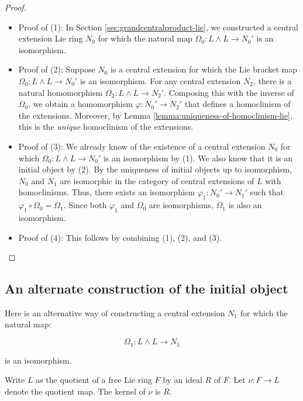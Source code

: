 \begin{proof}
  \begin{itemize}
  \item Proof of (1): In Section \ref{sec:grandcentralproduct-lie}, we
    constructed a central extension Lie ring $N_0$ for which the natural
    map $\Omega_0: L \wedge L \to N_0'$ is an isomorphism.

  \item Proof of (2): Suppose $N_0$ is a central extension for which
    the Lie bracket map $\Omega_0:L \wedge L \to N_0'$ is an
    isomorphism. For any central extension $N_2$, there is a natural
    homomorphism $\Omega_2: L \wedge L \to N_2'$. Composing this with
    the inverse of $\Omega_0$, we obtain a homomorphism
    $\varphi:N_0' \to N_2'$ that defines a homoclinism of the
    extensions. Moreover, by Lemma
    \ref{lemma:uniqueness-of-homoclinism-lie}, this is the {\em unique}
    homoclinism of the extensions.

  \item Proof of (3): We already know of the existence of a central
    extension $N_0$ for which $\Omega_0:L \wedge L \to N_0'$ is
    an isomorphism by (1). We also know that it is an initial object
    by (2). By the uniqueness of initial objects up to isomorphism,
    $N_0$ and $N_1$ are isomorphic in the category of central
    extensions of $L$ with homoclinisms. Thus, there exists an
    isomorphism $\varphi_1:N_0' \to N_1'$ such that $\varphi_1 \circ
    \Omega_0 = \Omega_1$. Since both $\varphi_1$ and $\Omega_0$ are
    isomorphisms, $\Omega_1$ is also an isomorphism.

  \item Proof of (4): This follows by combining (1), (2), and (3).
  \end{itemize}
\end{proof}

\subsection{An alternate construction of the initial object}\label{sec:freeinitialobject-lie}

Here is an alternative way of constructing a central extension $N_1$ for which the natural map:

$$\Omega_1:L \wedge L \to N_1$$

is an isomorphism.

Write $L$ as the quotient of a free Lie ring $F$ by an ideal $R$ of
$F$. Let $\nu:F \to L$ denote the quotient map. The kernel of $\nu$ is
$R$.

